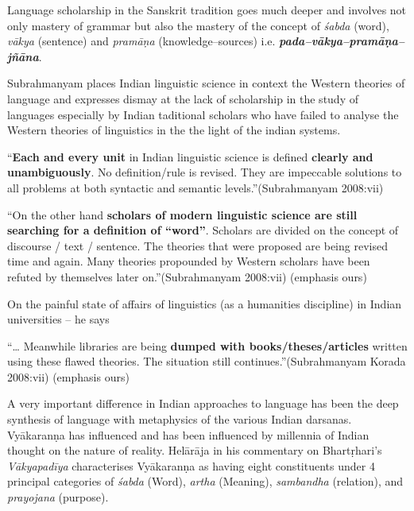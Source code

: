 Language scholarship in the Sanskrit tradition goes much deeper and involves not only mastery of grammar but also the mastery of the concept of \textit{śabda} (word), \textit{vākya} (sentence) and \textit{pramāṇa} (knowledge–sources) i.e. \textbf{\textit{pada–vākya–pramāṇa–jñāna}}.

Subrahmanyam places Indian linguistic science in context the Western theories of language and expresses dismay at the lack of scholarship in the study of languages especially by Indian taditional scholars who have failed to analyse the Western theories of linguistics in the the light of the indian systems.

\begin{myquote}
“\textbf{Each and every unit} in Indian linguistic science is defined \textbf{clearly and unambiguously}. No definition/rule is revised. They are impeccable solutions to all problems at both syntactic and semantic levels.”\hfill (Subrahmanyam 2008:vii)
\end{myquote}

\begin{myquote}
“On the other hand \textbf{scholars of modern linguistic science are still searching for a definition of “word”}. Scholars are divided on the concept of discourse / text / sentence. The theories that were proposed are being revised time and again. Many theories propounded by Western scholars have been refuted by themselves later on.”\hfill (Subrahmanyam 2008:vii) (emphasis ours)
\end{myquote}

On the painful state of affairs of linguistics (as a humanities discipline) in Indian universities – he says

\begin{myquote}
“… Meanwhile libraries are being \textbf{dumped with books/theses/articles} written using these flawed theories. The situation still continues.”\hfill (Subrahmanyam Korada 2008:vii) (emphasis ours)
\end{myquote}

A very important difference in Indian approaches to language has been the deep synthesis of language with metaphysics of the various Indian darsanas. Vyākaranṇa has influenced and has been influenced by millennia of Indian thought on the nature of reality. Helārāja in his commentary on Bhartṛhari’s \textit{Vākyapadīya} characterises Vyākaranṇa as having eight constituents under 4 principal categories of \textit{śabda} (Word), \textit{artha} (Meaning), \textit{sambandha} (relation), and \textit{prayojana} (purpose).

